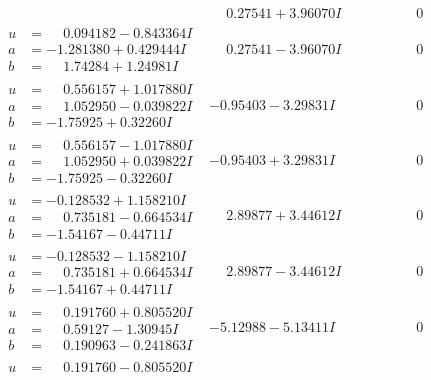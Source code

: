 \documentclass[1p]{elsarticle_modified}
\theoremstyle{definition}
\begin{document}
$$\begin{array}{c|c|c}
 & \phantom{-}0.27541 + 3.96070 I & \phantom{-0.000000 } 0 \\ \hline\begin{aligned}
u &= \phantom{-}0.094182 - 0.843364 I \\
a &= -1.281380 + 0.429444 I \\
b &= \phantom{-}1.74284 + 1.24981 I\end{aligned}
 & \phantom{-}0.27541 - 3.96070 I & \phantom{-0.000000 } 0 \\ \hline\begin{aligned}
u &= \phantom{-}0.556157 + 1.017880 I \\
a &= \phantom{-}1.052950 - 0.039822 I \\
b &= -1.75925 + 0.32260 I\end{aligned}
 & -0.95403 - 3.29831 I & \phantom{-0.000000 } 0 \\ \hline\begin{aligned}
u &= \phantom{-}0.556157 - 1.017880 I \\
a &= \phantom{-}1.052950 + 0.039822 I \\
b &= -1.75925 - 0.32260 I\end{aligned}
 & -0.95403 + 3.29831 I & \phantom{-0.000000 } 0 \\ \hline\begin{aligned}
u &= -0.128532 + 1.158210 I \\
a &= \phantom{-}0.735181 - 0.664534 I \\
b &= -1.54167 - 0.44711 I\end{aligned}
 & \phantom{-}2.89877 + 3.44612 I & \phantom{-0.000000 } 0 \\ \hline\begin{aligned}
u &= -0.128532 - 1.158210 I \\
a &= \phantom{-}0.735181 + 0.664534 I \\
b &= -1.54167 + 0.44711 I\end{aligned}
 & \phantom{-}2.89877 - 3.44612 I & \phantom{-0.000000 } 0 \\ \hline\begin{aligned}
u &= \phantom{-}0.191760 + 0.805520 I \\
a &= \phantom{-}0.59127 - 1.30945 I \\
b &= \phantom{-}0.190963 - 0.241863 I\end{aligned}
 & -5.12988 - 5.13411 I & \phantom{-0.000000 } 0 \\ \hline\begin{aligned}
u &= \phantom{-}0.191760 - 0.805520 I \\

\end{aligned}
\end{array}$$
\end{document}
